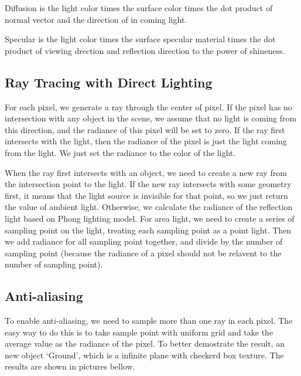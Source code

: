 \documentclass[acmtog]{acmart}
\begin{document}
Diffusion is the light color times the surface color times the dot product of normal vector and the direction of in coming light.

Specular is the light color times the surface specular material times the dot product of viewing drection and reflection direction to the power of shineness.

\subsection{Ray Tracing with Direct Lighting}
For each pixel, we generate a ray through the center of pixel. If the pixel has no intersection with any object in the scene, we assume that no light is coming from this direction, and the radiance of this pixel will be set to zero. If the ray first intersects with the light, then the radiance of the pixel is just the light coming from the light. We just set the radiance to the color of the light.

When the ray first intersects with an object, we need to create a new ray from the intersection point to the light. If the new ray intersects with some geometry first, it means that the light source is invisible for that point, so we just return the value of ambient light. Otherwise, we calculate the radiance of the reflection light based on Phong lighting model. For area light, we need to create a series of sampling point on the light, treating each sampling point as a point light. Then we add radiance for all sampling point together, and divide by the number of sampling point (because the radiance of a pixel should not be relavent to the number of sampling point).

\subsection{Anti-aliasing}
To enable anti-aliasing, we need to sample more than one ray in each pixel. The easy way to do this is to take sample point with uniform grid and take the average value as the radiance of the pixel.
To better demostrate the result, an new object `Ground', which is a infinite plane with checkerd box texture. The results are shown in pictures bellow.
\end{document}
